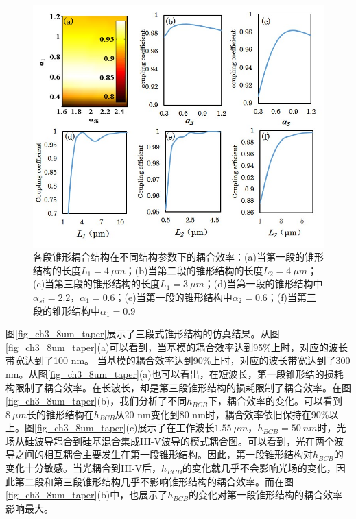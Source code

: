\begin{figure}[htb]
	\centering
	\includegraphics[width=14cm]{./Pictures/fig_ch3_sweep_structure.jpg}
	\caption{各段锥形耦合结构在不同结构参数下的耦合效率：(a)当第一段的锥形结构的长度$L_1 = 4~\mu m$；(b)当第二段的锥形结构的长度$L_2 = 4~\mu m$；(c)当第三段的锥形结构的长度$L_1 = 3~\mu m$；(d)当第一段的锥形结构中$\alpha_{si}= 2.2$，$\alpha_1 = 0.6$；(e)当第一段的锥形结构中$\alpha_2 = 0.6$；(f)当第三段的锥形结构中$\alpha_1 = 0.9$}
	\label{fig_ch3_sweep_structure}
\end{figure}

图\ref{fig_ch3_8um_taper}展示了三段式锥形结构的仿真结果。从图\ref{fig_ch3_8um_taper}(a)可以看到，当基模的耦合效率达到95\%上时，对应的波长带宽达到了100 nm。 当基模的耦合效率达到90\%上时，对应的波长带宽达到了300 nm。从图\ref{fig_ch3_8um_taper}(a)也可以看出，在短波长，第一段锥形结的损耗构限制了耦合效率。在长波长，却是第三段锥形结构的损耗限制了耦合效率。在图\ref{fig_ch3_8um_taper}(b)，我们分析了不同$h_{BCB}$下，耦合效率的变化。可以看到$8 ~\mu m$长的锥形结构在$h_{BCB}$从20 nm变化到80 nm时，耦合效率依旧保持在90\%以上。图\ref{fig_ch3_8um_taper}(c)展示了在工作波长$1.55~\mu m$，$h_{BCB} =  50 ~nm$时，光场从硅波导耦合到硅基混合集成III-V波导的模式耦合图。可以看到，光在两个波导之间的相互耦合主要发生在第一段锥形结构。因此，第一段锥形结构对$h_{BCB}$的变化十分敏感。当光耦合到III-V后，$h_{BCB}$的变化就几乎不会影响光场的变化，因此第二段和第三段锥形结构几乎不影响锥形结构的耦合效率。而在图\ref{fig_ch3_8um_taper}(b)中，也展示了$h_{BCB}$的变化对第一段锥形结构的耦合效率影响最大。

